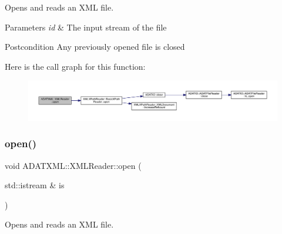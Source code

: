 Opens and reads an X\+ML file. 


\begin{DoxyParams}{Parameters}
{\em id} & The input stream of the file \\
\hline
\end{DoxyParams}
\begin{DoxyPostcond}{Postcondition}
Any previously opened file is closed 
\end{DoxyPostcond}
Here is the call graph for this function\+:
\nopagebreak
\begin{figure}[H]
\begin{center}
\leavevmode
\includegraphics[width=350pt]{db/d3f/classADATXML_1_1XMLReader_a7938cc7e08b0381e467eb7b916cbbd97_cgraph}
\end{center}
\end{figure}
\mbox{\label{classADATXML_1_1XMLReader_a7938cc7e08b0381e467eb7b916cbbd97}} 
\subsubsection{\texorpdfstring{open()}{open()}\hspace{0.1cm}{\footnotesize\ttfamily [4/6]}}
{\footnotesize\ttfamily void A\+D\+A\+T\+X\+M\+L\+::\+X\+M\+L\+Reader\+::open (\begin{DoxyParamCaption}\item[{std\+::istream \&}]{is }\end{DoxyParamCaption})\hspace{0.3cm}{\ttfamily [inline]}}



Opens and reads an X\+ML file. 


